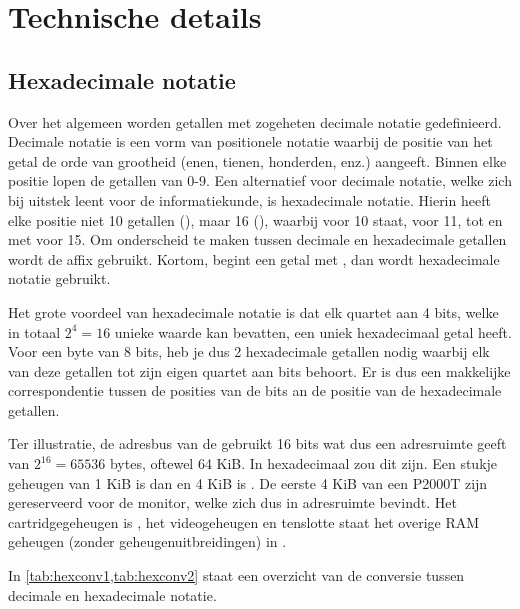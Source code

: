 \chapter{Technische details}
\chapterpreamble

%
%
%
\section{Hexadecimale notatie}
\label{sec:hexnot}

Over het algemeen worden getallen met zogeheten decimale notatie gedefinieerd. Decimale notatie is een vorm van positionele notatie waarbij de positie van het getal de orde van grootheid (enen, tienen, honderden, enz.) aangeeft. Binnen elke positie lopen de getallen van 0-9. Een alternatief voor decimale notatie, welke zich bij uitstek leent voor de informatiekunde, is hexadecimale notatie. Hierin heeft elke positie niet 10 getallen (), maar 16 (), waarbij  voor 10 staat,  voor 11, tot en met  voor 15. Om onderscheid te maken tussen decimale en hexadecimale getallen wordt de affix  gebruikt. Kortom, begint een getal met , dan wordt hexadecimale notatie gebruikt.


Het grote voordeel van hexadecimale notatie is dat elk quartet aan 4 bits, welke in totaal $2^{4} = 16$ unieke waarde kan bevatten, een uniek hexadecimaal getal heeft. Voor een byte van 8 bits, heb je dus 2 hexadecimale getallen nodig waarbij elk van deze getallen tot zijn eigen quartet aan bits behoort. Er is dus een makkelijke correspondentie tussen de posities van de bits an de positie van de hexadecimale getallen.

Ter illustratie, de adresbus van de  gebruikt 16 bits wat dus een adresruimte geeft van $2^{16} = 65536$ bytes, oftewel 64 KiB. In hexadecimaal zou dit  zijn. Een stukje geheugen van 1 KiB is dan  en 4 KiB is . De eerste 4 KiB van een P2000T zijn gereserveerd voor de monitor, welke zich dus in adresruimte  bevindt. Het cartridgegeheugen is , het videogeheugen  en tenslotte staat het overige RAM geheugen (zonder geheugenuitbreidingen) in .

In \cref{tab:hexconv1,tab:hexconv2} staat een overzicht van de conversie tussen decimale en hexadecimale notatie.

